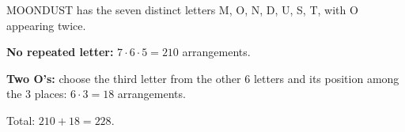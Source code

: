 MOONDUST has the seven distinct letters M, O, N, D, U, S, T, with O appearing twice.

\textbf{No repeated letter:} $7\cdot6\cdot5=210$ arrangements.

\textbf{Two O's:} choose the third letter from the other $6$ letters and its position among the $3$ places: $6\cdot3=18$ arrangements.

Total: $210+18=\boxed{228}$.
